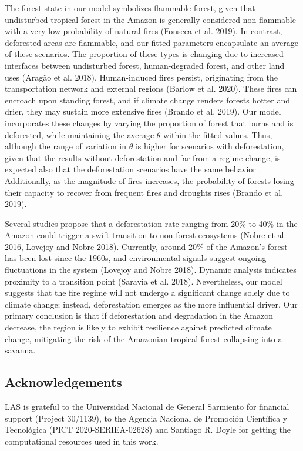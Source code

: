 \documentclass[
]{article}
\begin{document}
The forest state in our model symbolizes flammable forest, given that
undisturbed tropical forest in the Amazon is generally considered
non-flammable with a very low probability of natural fires (Fonseca et
al. 2019). In contrast, deforested areas are flammable, and our fitted
parameters encapsulate an average of these scenarios. The proportion of
these types is changing due to increased interfaces between undisturbed
forest, human-degraded forest, and other land uses (Aragão et al. 2018).
Human-induced fires persist, originating from the transportation network
and external regions (Barlow et al. 2020). These fires can encroach upon
standing forest, and if climate change renders forests hotter and drier,
they may sustain more extensive fires (Brando et al. 2019). Our model
incorporates these changes by varying the proportion of forest that
burns and is deforested, while maintaining the average \(\theta\) within
the fitted values. Thus, although the range of variation in \(\theta\)
is higher for scenarios with deforestation, given that the results
without deforestation and far from a regime change, is expected also
that the deforestation scenarios have the same behavior . Additionally,
as the magnitude of fires increases, the probability of forests losing
their capacity to recover from frequent fires and droughts rises (Brando
et al. 2019).

Several studies propose that a deforestation rate ranging from 20\% to
40\% in the Amazon could trigger a swift transition to non-forest
ecosystems (Nobre et al. 2016, Lovejoy and Nobre 2018). Currently,
around 20\% of the Amazon's forest has been lost since the 1960s, and
environmental signals suggest ongoing fluctuations in the system
(Lovejoy and Nobre 2018). Dynamic analysis indicates proximity to a
transition point (Saravia et al. 2018). Nevertheless, our model suggests
that the fire regime will not undergo a significant change solely due to
climate change; instead, deforestation emerges as the more influential
driver. Our primary conclusion is that if deforestation and degradation
in the Amazon decrease, the region is likely to exhibit resilience
against predicted climate change, mitigating the risk of the Amazonian
tropical forest collapsing into a savanna.

\subsection{Acknowledgements}\label{acknowledgements}

LAS is grateful to the Universidad Nacional de General Sarmiento for
financial support (Project 30/1139), to the Agencia Nacional de
Promoción Científica y Tecnológica (PICT 2020-SERIEA-02628) and Santiago
R. Doyle for getting the computational resources used in this work.
\end{document}

